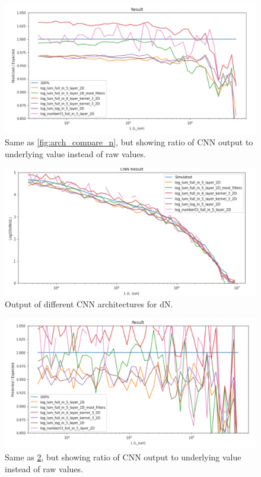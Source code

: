 \documentclass{article}
\begin{document}
			\begin{figure}[H]
				\centering
				\includegraphics[width=1.0\textwidth]{arch_compare_n_ratio.pdf}
				\caption{Same as \cref{fig:arch_compare_n}, but showing ratio of CNN output to underlying value instead of raw values.}
				\label{fig:arch_compare_n_ratio}
			\end{figure}

			\begin{figure}[H]
				\centering
				\includegraphics[width=1.0\textwidth]{arch_compare_dn.pdf}
				\caption{Output of different CNN architectures for dN.}
				\label{fig:arch_compare_dn}
			\end{figure}

			\begin{figure}[H]
				\centering
				\includegraphics[width=1.0\textwidth]{arch_compare_dn_ratio.pdf}
				\caption{Same as \cref{fig:arch_compare_dn}, but showing ratio of CNN output to underlying value instead of raw values.}
				\label{fig:arch_compare_dn_ratio}
			\end{figure}
\end{document}
